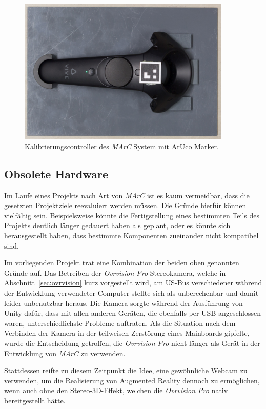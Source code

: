 	\begin{figure}[H]
		\centering
		\includegraphics[width=4in]{Bilder/Eigene Fotos/IMG_0032.jpg}
		\caption{Kalibrierungscontroller des \textit{MArC} System mit ArUco Marker.}
		\label{fig:KontrollerMarc}
	\end{figure}
\subsection{Obsolete Hardware}\label{sec:obsoleteHardware}
Im Laufe eines Projekts nach Art von \emph{MArC} ist es kaum vermeidbar, dass die gesetzten Projektziele reevaluiert werden müssen. Die Gründe hierfür können vielfältig sein. Beispielsweise könnte die Fertigstellung eines bestimmten Teils des Projekts deutlich länger gedauert haben als geplant, oder es könnte sich herausgestellt haben, dass bestimmte Komponenten zueinander nicht kompatibel sind.

Im vorliegenden Projekt trat eine Kombination der beiden oben genannten Gründe auf. Das Betreiben der \emph{Ovrvision Pro} Stereokamera, welche in Abschnitt~\ref{sec:ovrvision} kurz vorgestellt wird, am US-Bus verschiedener während der Entwicklung verwendeter Computer stellte sich als unberechenbar und damit leider unbenutzbar heraus. Die Kamera sorgte während der Ausführung von Unity dafür, dass mit allen anderen Geräten, die ebenfalls per USB angeschlossen waren, unterschiedlichste Probleme auftraten. Als die Situation nach dem Verbinden der Kamera in der teilweisen Zerstörung eines Mainboards gipfelte, wurde die Entscheidung getroffen, die \emph{Ovrvision Pro} nicht länger als Gerät in der Entwicklung von \emph{MArC} zu verwenden.

Stattdessen reifte zu diesem Zeitpunkt die Idee, eine gewöhnliche Webcam zu verwenden, um die Realisierung von Augmented Reality dennoch zu ermöglichen, wenn auch ohne den Stereo-3D-Effekt, welchen die \emph{Ovrvision Pro} nativ bereitgestellt hätte.

